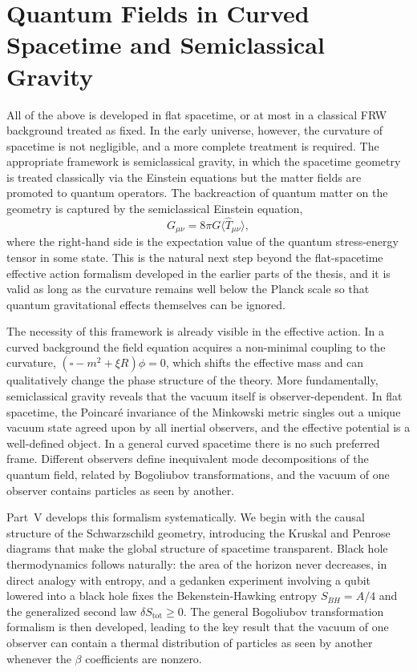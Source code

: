 \section*{Quantum Fields in Curved Spacetime and Semiclassical Gravity}

All of the above is developed in flat spacetime, or at most in a
classical FRW background treated as fixed. In the early universe,
however, the curvature of spacetime is not negligible, and a more
complete treatment is required. The appropriate framework is
semiclassical gravity, in which the spacetime geometry is treated
classically via the Einstein equations but the matter fields are
promoted to quantum operators. The backreaction of quantum matter on
the geometry is captured by the semiclassical Einstein equation,
\begin{equation*}
    G_{\mu\nu} = 8\pi G\langle\hat T_{\mu\nu}\rangle,
\end{equation*}
where the right-hand side is the expectation value of the quantum
stress-energy tensor in some state. This is the natural next step
beyond the flat-spacetime effective action formalism developed in the
earlier parts of the thesis, and it is valid as long as the curvature
remains well below the Planck scale so that quantum gravitational
effects themselves can be ignored.

The necessity of this framework is already visible in the effective
action. In a curved background the field equation acquires a
non-minimal coupling to the curvature,
$(\square - m^2 + \xi R)\phi = 0$, which shifts the effective mass
and can qualitatively change the phase structure of the theory.
More fundamentally, semiclassical gravity reveals that the vacuum
itself is observer-dependent. In flat spacetime, the Poincar\'e
invariance of the Minkowski metric singles out a unique vacuum state
agreed upon by all inertial observers, and the effective potential
is a well-defined object. In a general curved spacetime there is no
such preferred frame. Different observers define inequivalent mode
decompositions of the quantum field, related by Bogoliubov
transformations, and the vacuum of one observer contains particles
as seen by another.

Part~V develops this formalism systematically. We begin with the
causal structure of the Schwarzschild geometry, introducing the
Kruskal and Penrose diagrams that make the global structure of
spacetime transparent. Black hole thermodynamics follows naturally:
the area of the horizon never decreases, in direct analogy with
entropy, and a gedanken experiment involving a qubit lowered into a
black hole fixes the Bekenstein-Hawking entropy $S_{BH} = A/4$ and
the generalized second law $\delta S_{\text{tot}} \geq 0$. The
general Bogoliubov transformation formalism is then developed,
leading to the key result that the vacuum of one observer can
contain a thermal distribution of particles as seen by another
whenever the $\beta$ coefficients are nonzero.

